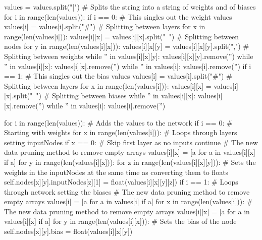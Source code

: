\documentclass{report}
\begin{document}
\begin{python}
        values = values.split("|")  # Splits the string into a string of weights and of biases
        for i in range(len(values)):
            if i == 0:  # This singles out the weight values
                values[i] = values[i].split("#")  # Splitting between layers
                for x in range(len(values[i])):
                    values[i][x] = values[i][x].split("~")  # Splitting between nodes
                    for y in range(len(values[i][x])):
                        values[i][x][y] = values[i][x][y].split(",")  # Splitting between weights
                        while '' in values[i][x][y]:
                            values[i][x][y].remove('')
                    while '' in values[i][x]:
                        values[i][x].remove('')
                while '' in values[i]:
                    values[i].remove('')
            if i == 1:  # This singles out the bias values
                values[i] = values[i].split("#")  # Splitting between layers
                for x in range(len(values[i])):
                    values[i][x] = values[i][x].split("~")  # Splitting between biases
                    while '' in values[i][x]:
                        values[i][x].remove('')
                while '' in values[i]:
                    values[i].remove('')

        for i in range(len(values)):  # Adds the values to the network
            if i == 0:  # Starting with weights
                for x in range(len(values[i])):  # Loops through layers setting inputNodes
                    if x == 0:  # Skip first layer as no inputs
                        continue
                    # The new data pruning method to remove empty arrays
                    values[i][x] = [a for a in values[i][x] if a]
                    for y in range(len(values[i][x])):
                        for z in range(len(values[i][x][y])):
                            # Sets the weights in the inputNodes at the same time as converting them to floats
                            self.nodes[x][y].inputNodes[z][1] = float(values[i][x][y][z])
            if i == 1:  # Loops through network setting the biases
                # The new data pruning method to remove empty arrays
                values[i] = [a for a in values[i] if a]
                for x in range(len(values[i])):
                    # The new data pruning method to remove empty arrays
                    values[i][x] = [a for a in values[i][x] if a]
                    for y in range(len(values[i][x])):
                        # Sets the bias of the node
                        self.nodes[x][y].bias = float(values[i][x][y])


\end{python}
\end{document}
